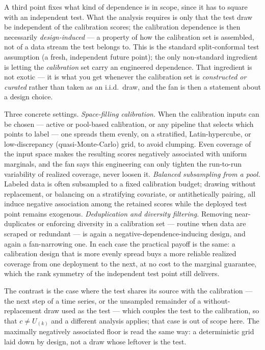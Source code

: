 \documentclass[11pt]{article}
\begin{document}
A third point fixes what kind of dependence is in scope, since it has to square with an independent
test. What the analysis requires is only that the test draw be independent of the calibration scores;
the calibration dependence is then necessarily \emph{design-induced} --- a property of how the
calibration set is assembled, not of a data stream the test belongs to. This is the standard
split-conformal test assumption (a fresh, independent future point); the only non-standard ingredient
is letting the \emph{calibration} set carry an engineered dependence. That ingredient is not exotic ---
it is what you get whenever the calibration set is \emph{constructed or curated} rather than taken as an
i.i.d.\ draw, and the fan is then a statement about a design choice.

Three concrete settings. \emph{Space-filling calibration.} When the calibration inputs can be chosen
--- active or pool-based calibration, or any pipeline that selects which points to label --- one spreads
them evenly, on a stratified, Latin-hypercube, or low-discrepancy (quasi-Monte-Carlo) grid, to avoid
clumping. Even coverage of the input space makes the resulting scores negatively associated with uniform
marginals, and the fan says this engineering can only tighten the run-to-run variability of realized
coverage, never loosen it. \emph{Balanced subsampling from a pool.} Labeled data is often subsampled to
a fixed calibration budget; drawing without replacement, or balancing on a stratifying covariate, or
antithetically pairing, all induce negative association among the retained scores while the deployed test
point remains exogenous. \emph{Deduplication and diversity filtering.} Removing near-duplicates or
enforcing diversity in a calibration set --- routine when data are scraped or redundant --- is again a
negative-dependence-inducing design, and again a fan-narrowing one. In each case the practical payoff is
the same: a calibration design that is more evenly spread buys a more reliable realized coverage from one
deployment to the next, at no cost to the marginal guarantee, which the rank symmetry of the independent
test point still delivers.

The contrast is the case where the test shares its source with the calibration --- the next step of a
time series, or the unsampled remainder of a without-replacement draw used as the test --- which couples
the test to the calibration, so that $c\ne U_{(k)}$ and a different analysis applies; that case is out of
scope here. The maximally negatively associated floor is read the same way: a deterministic grid laid
down by design, not a draw whose leftover is the test.
\end{document}
